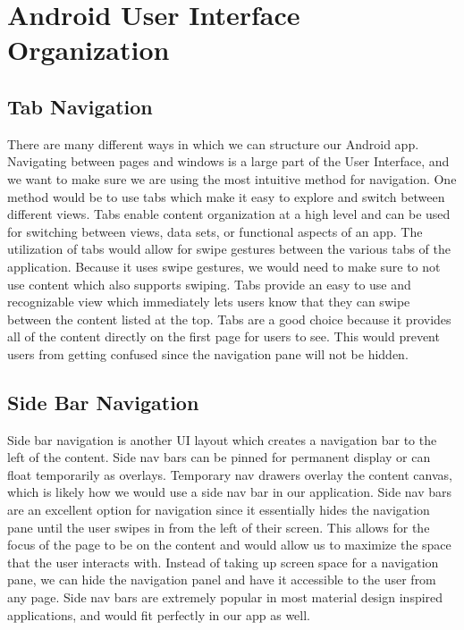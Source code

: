 \documentclass[letterpaper,10pt,draftclsnofoot,onecolumn,titlepage]{IEEEtran}
\begin{document}
	\section{Android User Interface Organization}
		\subsection{Tab Navigation}
			There are many different ways in which we can structure our Android app.
			Navigating between pages and windows is a large part of the User Interface, and we want to make sure we are using the most intuitive method for navigation.
			One method would be to use tabs which make it easy to explore and switch between different views.
			Tabs enable content organization at a high level and can be used for switching between views, data sets, or functional aspects of an app. \cite{Material-Tabs}
			The utilization of tabs would allow for swipe gestures between the various tabs of the application.
			Because it uses swipe gestures, we would need to make sure to not use content which also supports swiping.
			Tabs provide an easy to use and recognizable view which immediately lets users know that they can swipe between the content listed at the top.
			Tabs are a good choice because it provides all of the content directly on the first page for users to see.
			This would prevent users from getting confused since the navigation pane will not be hidden.

		\subsection{Side Bar Navigation}
			Side bar navigation is another UI layout which creates a navigation bar to the left of the content.
			Side nav bars can be pinned for permanent display or can float temporarily as overlays. \cite{Material-Side-Nav}
			Temporary nav drawers overlay the content canvas, which is likely how we would use a side nav bar in our application.
			Side nav bars are an excellent option for navigation since it essentially hides the navigation pane until the user swipes in from the left of their screen.
			This allows for the focus of the page to be on the content and would allow us to maximize the space that the user interacts with.
			Instead of taking up screen space for a navigation pane, we can hide the navigation panel and have it accessible to the user from any page.
			Side nav bars are extremely popular in most material design inspired applications, and would fit perfectly in our app as well.
\end{document}

